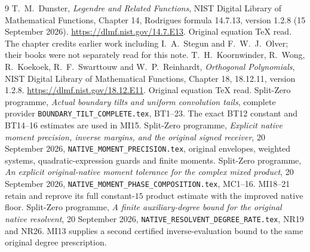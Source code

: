 \documentclass[11pt]{article}
\begin{document}
\begin{thebibliography}{9}
 T.~M.~Dunster, \emph{Legendre and Related Functions},
NIST Digital Library of Mathematical Functions, Chapter 14,
Rodrigues formula 14.7.13, version 1.2.8 (15 September 2026).
\url{https://dlmf.nist.gov/14.7.E13}. Original equation TeX read.
The chapter credits earlier work including I.~A.~Stegun and
F.~W.~J.~Olver; their books were not separately read for this note.
 T.~H.~Koornwinder, R.~Wong, R.~Koekoek,
R.~F.~Swarttouw and W.~P.~Reinhardt,
\emph{Orthogonal Polynomials}, NIST Digital Library of Mathematical
Functions, Chapter 18, 18.12.11, version 1.2.8.
\url{https://dlmf.nist.gov/18.12.E11}. Original equation TeX read.
 Split-Zero programme,
\emph{Actual boundary tilts and uniform convolution tails},
complete provider \texttt{BOUNDARY\_TILT\_COMPLETE.tex}, BT1--23.
The exact BT12 constant and BT14--16 estimates are used in MI15.
 Split-Zero programme,
\emph{Explicit native moment precision, inverse margins, and the
original signed receiver}, 20 September 2026,
\texttt{NATIVE\_MOMENT\_PRECISION.tex}, original envelopes,
weighted systems, quadratic-expression guards and finite moments.
 Split-Zero programme,
\emph{An explicit original-native moment tolerance for the complex
mixed product}, 20 September 2026,
\texttt{NATIVE\_MOMENT\_PHASE\_COMPOSITION.tex}, MC1--16.
MI18--21 retain and reprove its full constant-$15$ product estimate
with the improved native floor.
 Split-Zero programme,
\emph{A finite auxiliary-degree bound for the original native
resolvent}, 20 September 2026,
\texttt{NATIVE\_RESOLVENT\_DEGREE\_RATE.tex}, NR19 and NR26.
MI13 supplies a second certified inverse-evaluation bound to the
same original degree prescription.
\end{thebibliography}
\end{document}
